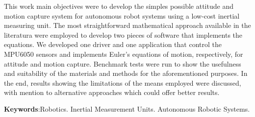 \begin{resumo}[ABSTRACT]
\begin{SingleSpacing}


    This work main objectives were to develop the simples possible attitude and motion capture system for autonomous robot systems using a low-cost inertial measuring unit.
    The most straightforward mathematical approach available in the literatura were employed to develop two pieces of software that implements the equations.
    We developed one driver and one application that control the MPU6050 sensors and implements Euler's equations of motion, respectively, for attitude and motion capture.
    Benchmark tests were run to show the usefulness and suitability of the materials and methods for the aforementioned purposes.
    In the end, results showing the limitations of the means employed were discussed, with mention to alternative approaches which could offer better results.

\textbf{Keywords}:Robotics. Inertial Measurement Units. Autonomous Robotic Systems.
\end{SingleSpacing}
\end{resumo}
